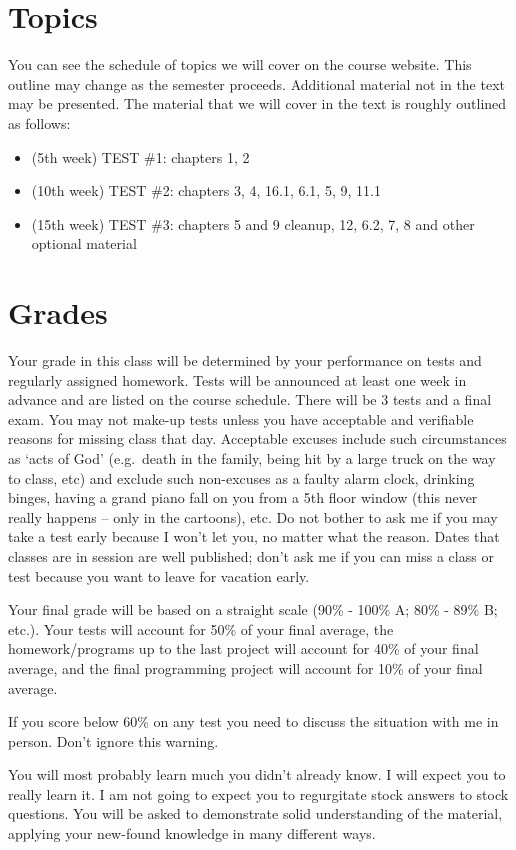 \documentclass{article}
\begin{document}
\section{Topics}
You can see the schedule of topics we will cover on the course website.
This outline may change as the semester proceeds.
Additional material not in the text may be presented.
The material that we will cover in the text is roughly outlined as follows:
\begin{itemize}
	\item (5th week) TEST \#1: chapters 1, 2
	\item (10th week) TEST \#2: chapters 3, 4, 16.1, 6.1, 5, 9, 11.1
	\item (15th week) TEST \#3: chapters 5 and 9 cleanup, 12, 6.2, 7, 8 and other optional material
\end{itemize}

\section{Grades}
Your grade in this class will be determined by your performance on tests and regularly assigned homework.
Tests will be announced at least one week in advance and are listed on the course schedule.
There will be 3 tests and a final exam.
You may not make-up tests unless you have acceptable and verifiable reasons for missing class that day.
Acceptable excuses include such circumstances as `acts of God' (e.g.\ death in the family, being hit by a large truck on the way to class, etc) and exclude such non-excuses as a faulty alarm clock, drinking binges, having a grand piano fall on you from a 5th floor window (this never really happens -- only in the cartoons), etc.
Do not bother to ask me if you may take a test early because I won't let you, no matter what the reason.
Dates that classes are in session are well published; don't ask me if you can miss a class or test because you want to leave for vacation early.

Your final grade will be based on a straight scale (90\% - 100\%  A;  80\% - 89\%  B; etc.).
Your tests will account for 50\% of your final average, the homework/programs up to the last project will account for 40\% of your final average, and the final programming project will account for 10\% of your final average.

If you score below 60\% on any test you need to discuss the situation with me in person. Don’t ignore this warning.

You will most probably learn much you didn't already know.
I will expect you to really learn it.
I am not going to expect you to regurgitate stock answers to stock questions.
You will be asked to demonstrate solid understanding of the material, applying your new-found knowledge in many different ways.
\end{document}

